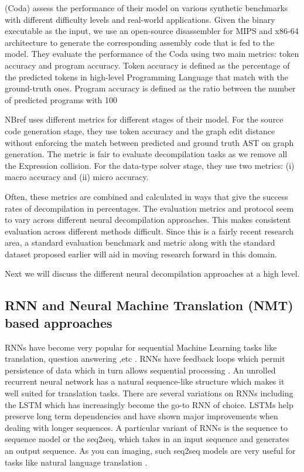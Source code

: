\documentclass{article}
\begin{document}
\citet{coda} (Coda) assess the performance of their model on various synthetic benchmarks with different difficulty levels and real-world applications. Given the binary executable as the input, we use an open-source disassembler \cite{mips,redasm} for MIPS \cite{hennessy1982mips} and x86-64 \cite{guide2011intel} architecture to generate the corresponding assembly code that is fed to the model. They evaluate the performance of the Coda using two main metrics: token accuracy and program accuracy. Token accuracy is defined as the percentage of the predicted tokens in high-level Programming Language that match with the ground-truth ones. Program accuracy is defined as the ratio between the number of predicted programs with 100%

NBref \cite{nbref} uses different metrics for different stages of their model. For the source code generation stage, they use token accuracy and the graph edit distance \cite{sanfeliu1983distance} without enforcing the match between predicted and ground truth AST on graph generation. The metric is fair to evaluate decompilation tasks as we remove all the Expression collision. For the data-type solver stage, they use two metrics: (i) macro accuracy and (ii) micro accuracy.

Often, these metrics are combined and calculated in ways that give the success rates of decompilation in percentages. The evaluation metrics and protocol seem to vary across different neural decompilation approaches. This makes consistent evaluation across different methods difficult. Since this is a fairly recent research area, a standard evaluation benchmark and metric along with the standard dataset proposed earlier will aid in moving research forward in this domain.

Next we will discuss the different neural decompilation approaches at a high level.

\subsection{RNN and Neural Machine Translation (NMT) based approaches}
RNNs have become very popular for sequential Machine Learning tasks like translation, question answering ,etc \cite{sutskever2014sequence}. RNNs have feedback loops which permit persistence of data which in turn allows sequential processing \cite{siegelmann1993foundations}. An unrolled recurrent neural network has a natural sequence-like structure which makes it well suited for translation tasks. There are several variations on RNNs including the LSTM \cite{hochreiter1997long} which has increasingly become the go-to RNN of choice. LSTMs help preserve long term dependencies and have shown major improvements when dealing with longer sequences. A particular variant of RNNs is the sequence to sequence model or the seq2seq, which takes in an input sequence and generates an output sequence. As you can imaging, such seq2seq models are very useful for tasks like natural language translation \cite{cho2014learning}.
\end{document}
